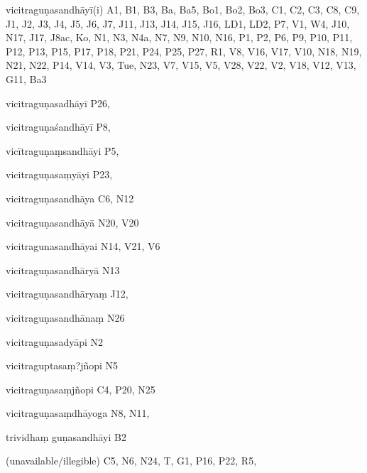 \begin{ekdosis}
\begin{marma}[hp01_055]
\begin{marma}[hp02_009]
\begin{marma}[hp02_011]
 \begin{marma}[hp02_023c]
\item[vicitraguṇasandhāyī(i)] A1, B1, B3, Ba, Ba5, Bo1, Bo2, Bo3, C1, C2, C3, C8, C9, J1, J2, J3, J4, J5, J6, J7, J11, J13, J14, J15, J16, LD1, LD2, P7, V1, W4, J10, N17, J17, J8ac, Ko, N1, N3, N4a, N7, N9, N10, N16, P1, P2, P6, P9, P10, P11, P12, P13, P15, P17, P18, P21, P24, P25, P27, R1, V8, V16, V17, V10, N18, N19, N21, N22, P14, V14, V3, Tue, N23, V7, V15, V5, V28, V22, V2, V18, V12, V13, G11, Ba3
\item[vicitraguṇasadhāyī] P26,
\item[vicitraguṇaśandhāyī]  P8, 
\item[vicītraguṇaṃsandhāyi] P5, 
\item[vicitraguṇasaṃyāyi] P23,
\item[vicitraguṇasandhāya]  C6, N12
\item[vicitraguṇasandhāyā] N20, V20
\item[vicitragunasandhāyai]  N14, V21, V6
\item[vicitraguṇasandhāryā]  N13
\item[vicitraguṇasandhāryaṃ]  J12,
\item[vicitraguṇasandhānaṃ] N26
\item[vicitraguṇasadyāpi] N2
\item[vicitraguptasaṃ?jñopi] N5
\item[vicitraguṇasaṃjñopi] C4, P20, N25
\item[vicitraguṇasaṃdhāyoga]  N8, N11,
\item[trividhaṃ guṇasandhāyi] B2
\item[(unavailable/illegible)] C5, N6, N24, T, G1, P16, P22, R5,
  \begin{description}

    \end{description}
 \end{marma}



\end{marma}
\end{marma}
\end{marma}
\end{ekdosis}
